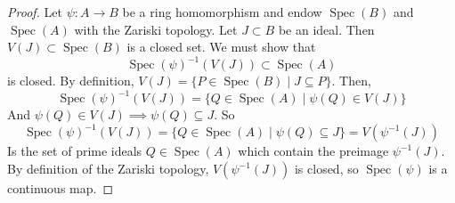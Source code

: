 \documentclass[hidelinks,12pt]{article}
\renewcommand{\sp}{\operatorname{Spec}}
\begin{document}
\begin{enumerate}
    \begin{proof}
        Let \(\psi:A\to B\) be a ring homomorphism and endow \(\sp(B)\) and \(\sp(A)\) with the Zariski topology. Let \(J\subset B\) be an ideal. Then \(V(J)\subset\sp(B)\) is a closed set. We must show that
        \[
            \sp(\psi)^{-1}(V(J))\subset\sp(A)
        \]
        is closed. By definition, \(V(J)=\{P\in\sp(B)\mid J\subseteq P\}\). Then,
    \[
        \sp(\psi)^{-1}(V(J))=\{Q\in\sp(A)\mid \psi(Q)\in V(J)\}
    \]
   And \(\psi(Q)\in V(J)\implies \psi(Q)\subseteq J\). So \[
        \sp(\psi)^{-1}(V(J))=\{Q\in\sp(A)\mid \psi(Q)\subseteq J\}=V(\psi^{-1}(J))
   \]
  Is the set of prime ideals \(Q\in\sp(A)\) which contain the preimage \(\psi^{-1}(J)\). By definition of the Zariski topology, \(V(\psi^{-1}(J))\) is closed, so \(\sp(\psi)\) is a continuous map.
    \end{proof}
\end{enumerate}
\end{document}
